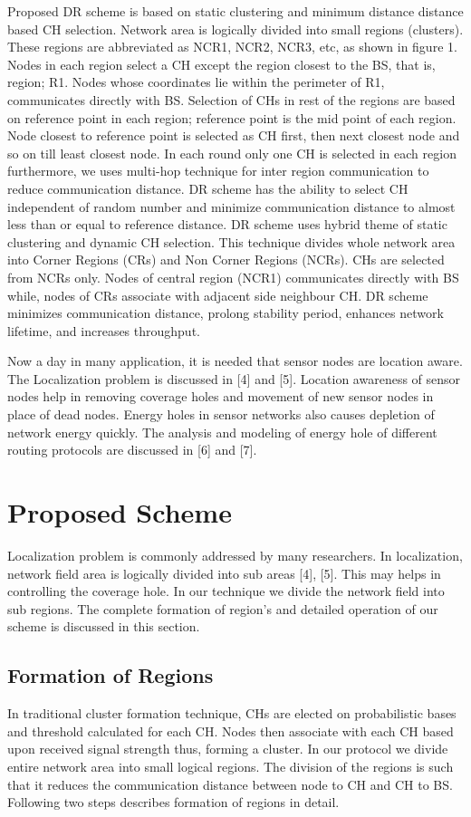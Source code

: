 \documentclass[3p,times,procedia]{elsarticle}
\begin{document}
Proposed DR scheme is based on static clustering and minimum distance distance based CH selection. Network area is logically divided into small regions (clusters). These regions are abbreviated as NCR1, NCR2, NCR3, etc, as shown in figure 1. Nodes in each region select a CH except the region closest to the BS, that is, region; R1. Nodes whose coordinates lie within the perimeter of R1, communicates directly with BS. Selection of CHs in rest of the regions are based on reference point in each region; reference point is the mid point of each region. Node closest to reference point is selected as CH first, then next closest node and so on till least closest node. In each round only one CH is selected in each region furthermore, we uses multi-hop technique for inter region communication to reduce communication distance. DR scheme has the ability to select CH independent of random number and minimize communication distance to almost less than or equal to reference distance. DR scheme uses hybrid theme of static clustering and dynamic CH selection. This technique divides whole network area into  Corner Regions (CRs) and  Non Corner Regions (NCRs). CHs are selected from NCRs only. Nodes of central region (NCR1) communicates directly with BS while, nodes of CRs associate with adjacent side neighbour CH. DR scheme minimizes communication distance, prolong stability period, enhances network lifetime, and increases throughput.

Now a day in many application, it is needed that sensor nodes are location aware. The Localization problem is discussed in [4] and [5]. Location awareness of sensor nodes help in removing coverage holes and movement of new sensor nodes in place of dead nodes. Energy holes in sensor networks also causes depletion of network energy quickly. The analysis and modeling of energy hole of different routing protocols are discussed in [6] and [7].

\section {Proposed Scheme}
Localization problem is commonly addressed by many researchers. In localization, network field area is logically divided into sub areas [4], [5]. This may helps in controlling the coverage hole. In our technique we divide the network field into sub regions. The complete formation of region's and detailed operation of our scheme is discussed in this section.

\subsection{Formation of Regions }
In traditional cluster formation technique, CHs are elected on probabilistic bases and threshold calculated for each CH. Nodes then associate with each CH based upon received signal strength thus, forming a cluster. In our protocol we divide entire network area into small logical regions. The division of the regions is such that it reduces the communication distance between node to CH and CH to BS. Following two steps describes formation of regions in detail.
\end{document}
